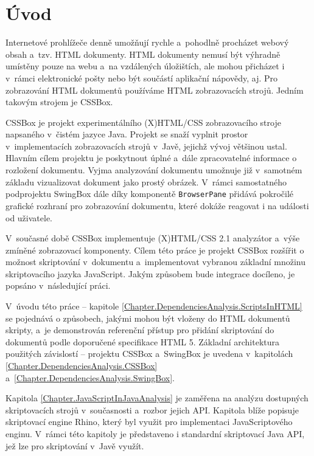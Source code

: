 
\chapter{Úvod}
\label{Chapter.Introducion}

Internetové prohlížeče denně umožňují rychle a~pohodlně procházet webový obsah a~tzv. HTML dokumenty. HTML dokumenty nemusí být výhradně umístěny pouze na webu a~na vzdálených úložištích, ale mohou přicházet i v~rámci elektronické pošty nebo být součástí aplikační nápovědy, aj. Pro zobrazování HTML dokumentů používáme HTML zobrazovacích strojů. Jedním takovým strojem je CSSBox.

CSSBox je projekt experimentálního (X)HTML/CSS zobrazovacího stroje napsaného v~čistém jazyce Java. Projekt se snaží vyplnit prostor v~implementacích zobrazovacích strojů v~Javě, jejichž vývoj většinou ustal. Hlavním cílem projektu je poskytnout úplné a~dále zpracovatelné informace o rozložení dokumentu. Vyjma analyzování dokumentu umožnuje již v~samotném základu vizualizovat dokument jako prostý obrázek. V~rámci samostatného podprojektu SwingBox dále díky komponentě \texttt{BrowserPane} přidává pokročilé grafické rozhraní pro zobrazování dokumentu, které dokáže reagovat i na události od uživatele.

V~současné době CSSBox implementuje (X)HTML/CSS 2.1 analyzátor a~výše zmíněné zobrazovací komponenty. Cílem této práce je projekt CSSBox rozšířit o možnost skriptování v~dokumentu a~implementovat vybranou základní množinu skriptovacího jazyka JavaScript. Jakým způsobem bude integrace docíleno, je popsáno v~následující práci.

V~úvodu této práce -- kapitole \ref{Chapter.DependenciesAnalysis.ScriptsInHTML} se pojednává o způsobech, jakými mohou být vloženy do HTML dokumentů skripty, a~je demonstrován referenční přístup pro přidání skriptování do dokumentů podle doporučené specifikace HTML 5. Základní architektura použitých závislostí -- projektu CSSBox a~SwingBox je uvedena v~kapitolách \ref{Chapter.DependenciesAnalysis.CSSBox} a~\ref{Chapter.DependenciesAnalysis.SwingBox}.

Kapitola \ref{Chapter.JavaScriptInJavaAnalysis} je zaměřena na analýzu dostupných skriptovacích strojů v~současnosti a~rozbor jejich API. Kapitola blíže popisuje skriptovací engine Rhino, který byl využit pro implementaci JavaScriptového enginu. V~rámci této kapitoly je představeno i standardní skriptovací Java API, jež lze pro skriptování v~Javě využít.

